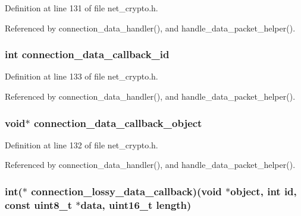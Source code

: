 Definition at line 131 of file net\+\_\+crypto.\+h.



Referenced by connection\+\_\+data\+\_\+handler(), and handle\+\_\+data\+\_\+packet\+\_\+helper().

\hypertarget{struct_crypto___connection_a7d50567cce6cb1b8ef983e64060d414e}{
\subsubsection[{connection\+\_\+data\+\_\+callback\+\_\+id}]{\setlength{\rightskip}{0pt plus 5cm}int connection\+\_\+data\+\_\+callback\+\_\+id}}\label{struct_crypto___connection_a7d50567cce6cb1b8ef983e64060d414e}


Definition at line 133 of file net\+\_\+crypto.\+h.



Referenced by connection\+\_\+data\+\_\+handler(), and handle\+\_\+data\+\_\+packet\+\_\+helper().

\hypertarget{struct_crypto___connection_a3c44dfac7528ae10a6d09bf812f36486}{
\subsubsection[{connection\+\_\+data\+\_\+callback\+\_\+object}]{\setlength{\rightskip}{0pt plus 5cm}void$\ast$ connection\+\_\+data\+\_\+callback\+\_\+object}}\label{struct_crypto___connection_a3c44dfac7528ae10a6d09bf812f36486}


Definition at line 132 of file net\+\_\+crypto.\+h.



Referenced by connection\+\_\+data\+\_\+handler(), and handle\+\_\+data\+\_\+packet\+\_\+helper().

\hypertarget{struct_crypto___connection_ab5af8aad05ddc085e69ead928cc26313}{
\subsubsection[{connection\+\_\+lossy\+\_\+data\+\_\+callback}]{\setlength{\rightskip}{0pt plus 5cm}int($\ast$ connection\+\_\+lossy\+\_\+data\+\_\+callback)(void $\ast$object, int id, const uint8\+\_\+t $\ast$data, uint16\+\_\+t length)}}\label{struct_crypto___connection_ab5af8aad05ddc085e69ead928cc26313}


